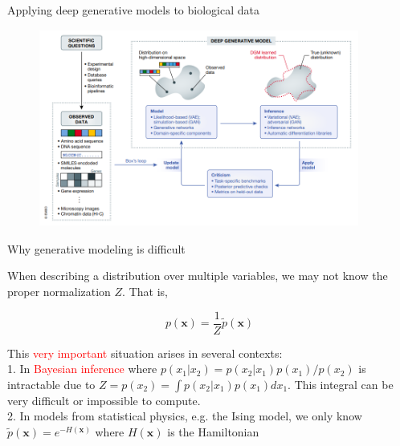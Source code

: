 \documentclass{beamer}					%
\begin{document}
\begin{frame}{Applying deep generative models to biological data}
\begin{figure}
\includegraphics[height=65mm, width=105mm]{dbm}
\end{figure}
\end{frame}

\begin{frame}{Why generative modeling is difficult}

When describing a distribution over multiple variables, we may not know the proper normalization $Z$. That is,

\begin{equation*}
p(\mathbf{x}) = \frac{1}{Z}\tilde{p}(\mathbf{x})
\end{equation*}

\vspace{0.1in}
This \textcolor{red}{very important} situation arises in several contexts:\\
\vspace{0.1in}
1. In \textcolor{red}{Bayesian inference} where $p(x_{1}|x_{2}) = p(x_{2}|x_{1})p(x_{1})/p(x_{2})$ is intractable due to $Z = p(x_{2}) = \int p(x_{2}|x_{1})p(x_{1})dx_{1}$. This integral can be very difficult or impossible to
compute.\\
\vspace{0.1in}
2. In models from statistical physics, e.g. the Ising model, we only know
$\tilde{p}(\mathbf{x}) = e^{−H(\mathbf{x})}$ where $H(\mathbf{x})$ is the Hamiltonian

\end{frame}
\end{document}
